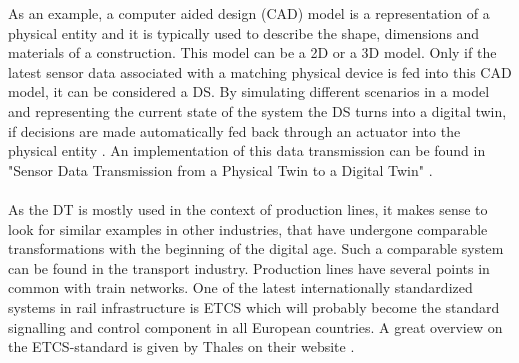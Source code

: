 As an example, a computer aided design (CAD) model is a representation of a physical entity and it is typically used to describe the shape, dimensions and materials of a construction. This model can be a 2D or a 3D model. Only if the latest sensor data associated with a matching physical device is fed into this CAD model, it can be considered a DS. \cite{WongWhatisDT} By simulating different scenarios in a model and representing the current state of the system the DS turns into a digital twin, if decisions are made automatically fed back through an actuator into the physical entity \cite{SchleichDTshaping}.
An implementation of this data transmission can be found in "Sensor Data Transmission from a Physical Twin to a Digital Twin" \cite{AlaDTdataTransmission}.\\
\\
As the \ac{DT} is mostly used in the context of production lines, it makes sense to look for similar examples in other industries, that have undergone comparable transformations with the beginning of the digital age.
Such a comparable system can be found in the transport industry. 
Production lines have several points in common with train networks.
One of the latest internationally standardized systems in rail infrastructure is \ac{ETCS} which will probably become the standard signalling and control component in all European countries. 
A great overview on the \ac{ETCS}-standard is given by Thales on their website \cite{ThalesETCS}.\\

